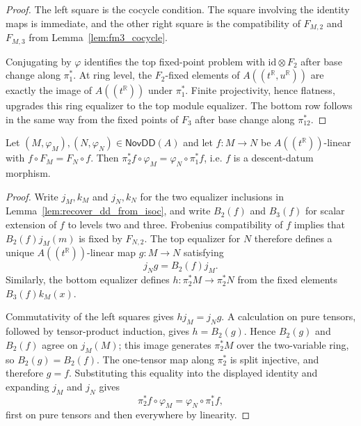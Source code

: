 \begin{proof}
  \leanok
  The left square is the cocycle condition.  The square involving the identity
  maps is immediate, and the other right square is the compatibility of
  $F_{M,2}$ and $F_{M,3}$ from Lemma~\ref{lem:fm3_cocycle}.

  Conjugating by $\varphi$ identifies the top fixed-point problem with
  $\mathrm{id}\otimes F_2$ after base change along $\pi_1^\ast$.  At ring
  level, the $F_2$-fixed elements of
  $A((t^{\mathbb{R}},u^{\mathbb{R}}))$ are exactly the image of
  $A((t^{\mathbb{R}}))$ under $\pi_1^\ast$.  Finite projectivity, hence
  flatness, upgrades this ring equalizer to the top module equalizer.  The
  bottom row follows in the same way from the fixed points of $F_3$ after base
  change along $\pi_{12}^\ast$.
\end{proof}

\begin{lemma}
  \label{lem:descent_to_isoc_full_aux}
  \leanok
  Let $(M, \varphi_M), (N, \varphi_N) \in \mathsf{NovDD}(A)$ and let
  $f \colon M \to N$ be $A((t^{\mathbb{R}}))$-linear with $f \circ F_M = F_N
  \circ f$.  Then $\pi_2^\ast f \circ \varphi_M = \varphi_N \circ \pi_1^\ast f$,
  i.e. $f$ is a descent-datum morphism.
\end{lemma}

\begin{proof}
  \leanok
  Write $j_M,k_M$ and $j_N,k_N$ for the two equalizer inclusions in
  Lemma~\ref{lem:recover_dd_from_isoc}, and write $B_2(f)$ and $B_3(f)$ for
  scalar extension of $f$ to levels two and three.  Frobenius compatibility of
  $f$ implies that $B_2(f)j_M(m)$ is fixed by $F_{N,2}$.  The top equalizer for
  $N$ therefore defines a unique $A((t^{\mathbb{R}}))$-linear map
  $g\colon M\to N$ satisfying
  \[
    j_Ng=B_2(f)j_M.
  \]
  Similarly, the bottom equalizer defines
  $h\colon\pi_2^\ast M\to\pi_2^\ast N$ from the fixed elements
  $B_3(f)k_M(x)$.

  Commutativity of the left squares gives $h j_M=j_Ng$.  A calculation on pure
  tensors, followed by tensor-product induction, gives $h=B_2(g)$.  Hence
  $B_2(g)$ and $B_2(f)$ agree on $j_M(M)$; this image generates
  $\pi_2^\ast M$ over the two-variable ring, so $B_2(g)=B_2(f)$.  The
  one-tensor map along $\pi_2^\ast$ is split injective, and therefore $g=f$.
  Substituting this equality into the displayed identity and expanding $j_M$
  and $j_N$ gives
  \[
    \pi_2^\ast f\circ\varphi_M
      =\varphi_N\circ\pi_1^\ast f,
  \]
  first on pure tensors and then everywhere by linearity.
\end{proof}

